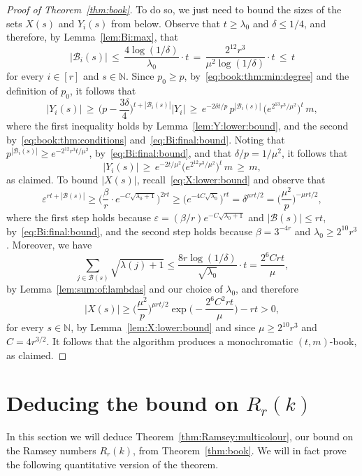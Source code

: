\documentclass[12pt,reqno]{amsart}
\theoremstyle{definition}
\theoremstyle{remark}
\newcommand\N{\mathbb{N}}
\newcommand\cB{\mathcal{B}}
\newcommand\eps{\varepsilon}
\renewcommand{\le}{\leqslant}
\renewcommand{\ge}{\geqslant}
\def\eps{\varepsilon}
\def\N{\mathbb{N}}
\def\cB{\mathcal{B}}
\begin{document}
\begin{proof}[Proof of Theorem~\ref{thm:book}]
To do so, we just need to bound the sizes of the sets $X(s)$ and $Y_i(s)$ from below. Observe that $t \ge \lambda_0$ and $\delta \le 1/4$, and therefore, by Lemma~\ref{lem:Bi:max}, that
\begin{equation}\label{eq:Bi:final:bound}
|\cB_i(s)| \, \le \, \frac{4 \log(1/\delta)}{\lambda_0} \cdot t \, = \, \frac{2^{12} r^3}{\mu^2 \log(1/\delta)} \cdot t \, \le \, t
\end{equation}
for every $i \in [r]$ and $s \in \N$. Since $p_0 \ge p$, by~\eqref{eq:book:thm:min:degree} and the definition of $p_0$, it follows that  
$$|Y_i(s)| \, \ge \, \bigg( p - \frac{3\delta}{4} \bigg)^{t + |\cB_i(s)|} |Y_i| \, \ge \, e^{-2\delta t / p} \, p^{|\cB_i(s)|} \, \big( e^{2^{13} r^3 / \mu^2} \big)^t \, m,$$
where the first inequality holds by Lemma~\ref{lem:Y:lower:bound}, and the second by~\eqref{eq:book:thm:conditions} and~\eqref{eq:Bi:final:bound}. Noting that $p^{|\cB_i(s)|} \ge e^{-2^{12} r^3 t / \mu^2}$, by~\eqref{eq:Bi:final:bound}, and that $\delta / p = 1/\mu^2$, it follows that 
$$|Y_i(s)| \, \ge \, e^{-2 t / \mu^2} \big( e^{2^{12} r^3 / \mu^2} \big)^t \, m \, \ge \, m,$$
as claimed. To bound $|X(s)|$, recall~\eqref{eq:X:lower:bound} and observe that 
$$\eps^{rt + |\cB(s)|}  \ge \bigg( \frac{\beta}{r} \cdot e^{- C \sqrt{\lambda_0 + 1}} \bigg)^{2rt} \ge \big( e^{- 4C \sqrt{\lambda_0}} \big)^{rt} = \delta^{\mu r t/2} = \bigg( \frac{\mu^2}{p} \bigg)^{-\mu r t / 2},$$
where the first step holds because $\eps = (\beta / r) e^{- C \sqrt{\lambda_0 + 1}}$ and $|\cB(s)| \le rt$, by~\eqref{eq:Bi:final:bound}, and the second step holds because $\beta = 3^{-4r}$ and $\lambda_0 \ge 2^{10} r^3$. Moreover, we have
$$\sum_{j \in \cB(s)} \sqrt{\lambda(j)+1} \le \frac{8r \log(1/\delta)}{\sqrt{\lambda_0}} \cdot t = \frac{2^6Crt}{\mu},$$
by Lemma~\ref{lem:sum:of:lambdas} and our choice of $\lambda_0$, and therefore 
$$|X(s)| \ge \bigg( \frac{\mu^2}{p} \bigg)^{\mu r t / 2} \exp\bigg( - \frac{2^6C^2rt}{\mu} \bigg) - rt > 0,$$
for every $s \in \N$, by Lemma~\ref{lem:X:lower:bound} and since $\mu \ge 2^{10} r^3$ and $C = 4r^{3/2}$. It follows that the algorithm produces a monochromatic $(t,m)$-book, as claimed. 
\end{proof}



\section{Deducing the bound on $R_r(k)$}\label{sec:final:proof}

In this section we will deduce Theorem~\ref{thm:Ramsey:multicolour}, our bound on the Ramsey numbers $R_r(k)$, from Theorem~\ref{thm:book}. We will in fact prove the following quantitative version of the theorem.
\end{document}
